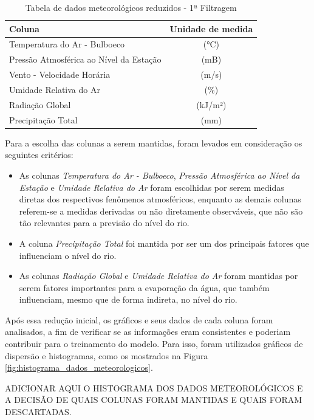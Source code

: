 \begin{table}[H]
	\centering
	\begin{tabular}{|p{10cm}|c|}
	\hline
	\textbf{Coluna} & \textbf{Unidade de medida} \\
	\hline
	Temperatura do Ar - Bulboeco & (°C) \\
	Pressão Atmosférica ao Nível da Estação & (mB) \\
	Vento - Velocidade Horária & (m/s) \\
	Umidade Relativa do Ar & (\%) \\
	Radiação Global & (kJ/m²) \\
	Precipitação Total & (mm) \\
	\hline
	\end{tabular}
	\caption{Tabela de dados meteorológicos reduzidos - 1ª Filtragem}
	\label{tab:colunas_dados_meteorologicos_reduzidas}
\end{table}

Para a escolha das colunas a serem mantidas, foram levados em consideração os seguintes critérios:
\begin{itemize}
	\item As colunas \textit{Temperatura do Ar - Bulboeco}, \textit{Pressão Atmosférica ao Nível da Estação} e \textit{Umidade Relativa do Ar} foram escolhidas por serem medidas diretas dos respectivos fenômenos atmosféricos, enquanto as demais colunas referem-se a medidas derivadas ou não diretamente observáveis, que não são tão relevantes para a previsão do nível do rio.
	\item A coluna \textit{Precipitação Total} foi mantida por ser um dos principais fatores que influenciam o nível do rio.
	\item As colunas \textit{Radiação Global} e \textit{Umidade Relativa do Ar} foram mantidas por serem fatores importantes para a evaporação da água, que também influenciam, mesmo que de forma indireta, no nível do rio.
\end{itemize}

Após essa redução inicial, os gráficos e seus dados de cada coluna foram analisados, a fim de verificar se as informações eram consistentes e poderiam contribuir para o treinamento do modelo. Para isso, foram utilizados gráficos de dispersão e histogramas, como os mostrados na Figura \ref{fig:histograma_dados_meteorologicos}.

ADICIONAR AQUI O HISTOGRAMA DOS DADOS METEOROLÓGICOS E A DECISÃO DE QUAIS COLUNAS FORAM MANTIDAS E QUAIS FORAM DESCARTADAS.

